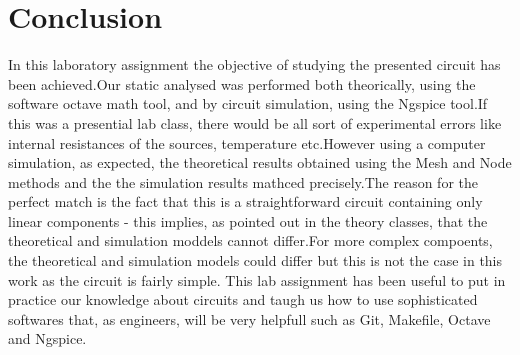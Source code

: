 \section{Conclusion}
\label{sec:conclusion}

In this laboratory assignment the objective of studying the presented circuit has been achieved.Our static analysed was performed both theorically, using the software octave math tool, and by circuit simulation, using the Ngspice tool.If this was a presential lab class, there would be all sort of experimental errors like internal resistances of the sources, temperature etc.However using a computer simulation, as expected, the theoretical results obtained using the Mesh and Node methods and the the simulation results mathced precisely.The reason for the perfect match is the fact that this is a straightforward circuit containing only linear components - this implies, as pointed out in the theory classes, that the theoretical and simulation moddels cannot differ.For more complex compoents, the theoretical and simulation models could differ but this is not the case in this work as the circuit is fairly simple.
This lab assignment has been useful to put in practice our knowledge about circuits and taugh us how to use sophisticated softwares that, as engineers, will be very helpfull such as Git, Makefile, Octave and Ngspice.
